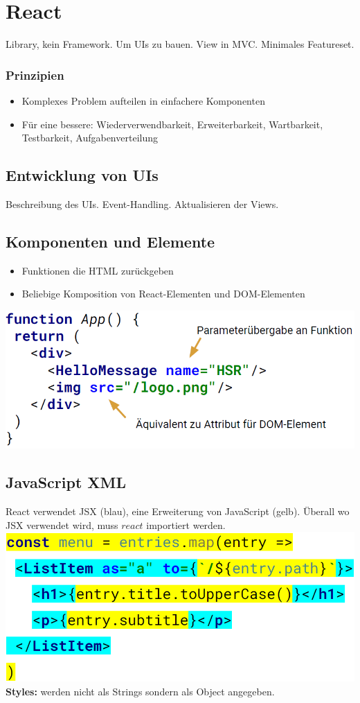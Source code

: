 
\section{React}
Library, kein Framework.
Um UIs zu bauen.
View in MVC.
Minimales Featureset.

\subsubsection{Prinzipien}
\begin{itemize}
    \item Komplexes Problem aufteilen in einfachere Komponenten
    \item Für eine bessere: Wiederverwendbarkeit, Erweiterbarkeit, Wartbarkeit, Testbarkeit, Aufgabenverteilung
\end{itemize}

\subsection{Entwicklung von UIs}
Beschreibung des UIs.
Event-Handling.
Aktualisieren der Views.

\subsection{Komponenten und Elemente}
\begin{itemize}
    \item Funktionen die HTML zurückgeben
    \item Beliebige Komposition von React-Elementen und DOM-Elementen
\end{itemize}
\includegraphics[width=0.6\linewidth]{img/react_component.png}

\subsection{JavaScript XML}
React verwendet JSX (blau), eine Erweiterung von JavaScript (gelb).
Überall wo JSX verwendet wird, muss $react$ importiert werden.\\
\includegraphics[width=0.6\linewidth]{img/react_jsx.png}\\
\textbf{Styles:} werden nicht als Strings sondern als Object angegeben.


